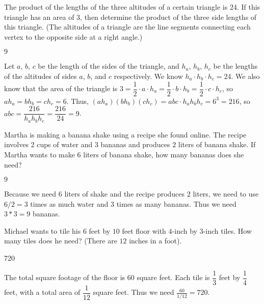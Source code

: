 \documentclass{article}
\begin{document}
\begin{problem}
The product of the lengths of the three altitudes of a certain triangle is 24. If this triangle has an area of 3, then determine the product of the three side lengths of this triangle.  (The altitudes of a triangle are the line segments connecting each vertex to the opposite side at a right angle.) %
\end{problem}
\begin{answer}
$9$
\end{answer}
\begin{solution}
Let $a$, $b$, $c$ be the length of the sides of the triangle, and $h_a$, $h_b$, $h_c$ be the lengths of the altitudes of sides $a$, $b$, and $c$ respectively. We know $h_a \cdot h_b \cdot h_c = 24$. We also know that the area of the triangle is $3 = \dfrac12 \cdot a \cdot h_a = \dfrac12 \cdot b \cdot h_b = \dfrac12 \cdot c \cdot h_c$, so $ah_a = bh_b = ch_c = 6$. Thus, $(ah_a)(bh_b)(ch_c) = abc \cdot h_ah_bh_c = 6^3 = 216$, so $abc = \dfrac{216}{h_ah_bh_c} = \dfrac{216}{24} = \boxed{9}$.
\end{solution}



\begin{problem}
Martha is making a banana shake using a recipe she found online. The recipe involves $2$ cups of water and $3$ bananas and produces $2$ liters of banana shake. If Martha wants to make $6$ liters of banana shake, how many bananas does she need?
\end{problem}
\begin{answer}
$9$
\end{answer}
\begin{solution}
Because we need $6$ liters of shake and the recipe produces $2$ liters, we need to use $6/2 = 3$ times as much water and $3$ times as many bananas. Thus we need $3*3 = \boxed{9}$ bananas. 
\end{solution}

\begin{problem}
Michael wants to tile his $6$ feet by $10$ feet floor with $4$-inch by $3$-inch tiles. How many tiles does he need? (There are $12$ inches in a foot).
\end{problem}
\begin{answer}
720
\end{answer}
\begin{solution}
The total square footage of the floor is $60$ square feet. Each tile is $\dfrac{1}{3}$ feet by $\dfrac{1}{4}$ feet, with a total area of $\dfrac{1}{12}$ square feet. Thus we need $\frac{60}{1/12} = \boxed{720}$.
\end{solution}
\end{document}

